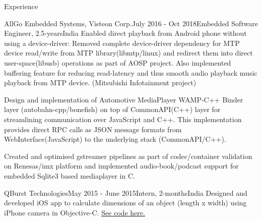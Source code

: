 \documentclass[
	a4paper, %
	11pt, %
]{resume} %
\begin{document}
\begin{rSection}{Experience}
\begin{rSubsection}{AllGo Embedded Systems, Visteon Corp.}{July 2016 - Oct 2018}{Embedded Software Engineer, 2.5-years}{India}
            Enabled direct playback from Android phone without using a device-driver: Removed complete device-driver dependency for MTP device read/write from MTP library(libmtp/linux) and redirect them into direct user-space(libusb) operations as part of AOSP project. Also implemented buffering feature for reducing read-latency and thus smooth audio playback music playback from MTP device. (Mitsubishi Infotainment project) \hfill

            Design and implementation of Automotive MediaPlayer WAMP-C++ Binder layer (autobahn-cpp/bonefish) on top of CommonAPI(C++) layer for streamlining communication over JavaScript and C++. This implementation provides direct RPC calls as JSON message formats from WebInterface(JavaScript) to the underlying stack (CommonAPI/C++).

            Created and optimised gstreamer pipelines as part of codec/container validation on Renesas/imx platform and implemented audio-book/podcast support for embedded Sqlite3 based mediaplayer in C.

	\end{rSubsection}

	\begin{rSubsection}{QBurst Technologies}{May 2015 - June 2015}{Intern, 2-months}{India}
            Designed and developed iOS app to calculate dimensions of an object (length x width) using iPhone camera in Objective-C.
            \href{https://github.com/sebinsphilip/The\_Dimension\_Tool} {See code here.}

	\end{rSubsection}
 
\end{rSection}

\end{document}
